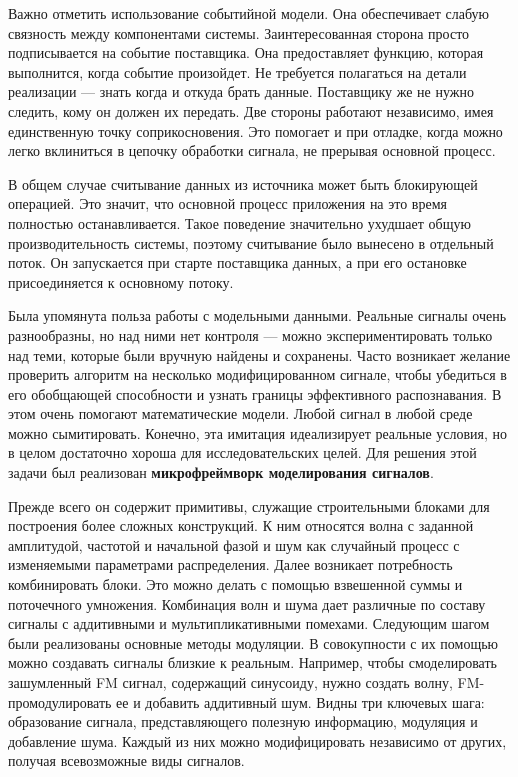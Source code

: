 Важно отметить использование событийной модели. Она обеспечивает слабую связность между компонентами системы. Заинтересованная сторона просто подписывается на событие поставщика. Она предоставляет функцию, которая выполнится, когда событие произойдет. Не требуется полагаться на детали реализации --- знать когда и откуда брать данные. Поставщику же не нужно следить, кому он должен их передать. Две стороны работают независимо, имея единственную точку соприкосновения. Это помогает и при отладке, когда можно легко вклиниться в цепочку обработки сигнала, не прерывая основной процесс.

В общем случае считывание данных из источника может быть блокирующей операцией. Это значит, что основной процесс приложения на это время полностью останавливается. Такое поведение значительно ухудшает общую производительность системы, поэтому считывание было вынесено в отдельный поток. Он запускается при старте поставщика данных, а при его остановке присоединяется к основному потоку.

Была упомянута польза работы с модельными данными. Реальные сигналы очень разнообразны, но над ними нет контроля --- можно экспериментировать только над теми, которые были вручную найдены и сохранены. Часто возникает желание проверить алгоритм на несколько модифицированном сигнале, чтобы убедиться в его обобщающей способности и узнать границы эффективного распознавания. В этом очень помогают математические модели. Любой сигнал в любой среде можно сымитировать. Конечно, эта имитация идеализирует реальные условия, но в целом достаточно хороша для исследовательских целей. Для решения этой задачи был реализован \textbf{микрофреймворк моделирования сигналов}.

Прежде всего он содержит примитивы, служащие строительными блоками для построения более сложных конструкций. К ним относятся волна с заданной амплитудой, частотой и начальной фазой и шум как случайный процесс с изменяемыми параметрами распределения. Далее возникает потребность комбинировать блоки. Это можно делать с помощью взвешенной суммы и поточечного умножения. Комбинация волн и шума дает различные по составу сигналы с аддитивными и мультипликативными помехами. Следующим шагом были реализованы основные методы модуляции. В совокупности с их помощью можно создавать сигналы близкие к реальным. Например, чтобы смоделировать зашумленный FM сигнал, содержащий синусоиду, нужно создать волну, FM-промодулировать ее и добавить аддитивный шум. Видны три ключевых шага: образование сигнала, представляющего полезную информацию, модуляция и добавление шума. Каждый из них можно модифицировать независимо от других, получая всевозможные виды сигналов.

